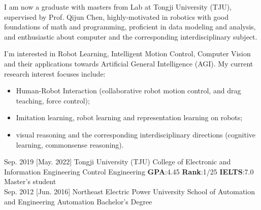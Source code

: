 \documentclass{resume}
\begin{document}
\makeheader

I am now a graduate with masters from  Lab at Tongji University (TJU), supervised by Prof.  {Qijun Chen}, highly-motivated in robotics with good foundations of math and programming, proficient in data modeling and analysis, and enthusiastic about computer and the corresponding interdisciplinary subject.

I'm interested in Robot Learning, Intelligent Motion Control, Computer Vision and their applications towards Artificial General Intelligence (AGI). My current research interest focuses include:
\begin{itemize}
  \item Human-Robot Interaction (collaborative robot motion control, and drag teaching, force control);
  \item Imitation learning, robot learning and representation learning on robots;
  \item visual reasoning and the corresponding interdisciplinary directions (cognitive learning, commonsense reasoning).\\
\end{itemize}

\begin{educations}
  \education%
    {Sep. 2019}%
    [May. 2022]%
    {Tongji University (TJU)}%
    {College of Electronic and Information Engineering}%
    {Control Engineering \quad \textbf{GPA}:4.45 \quad \textbf{Rank}:1/25 \quad \textbf{IELTS}:7.0}%
    {Master's student}\\

  \separator{0.5ex}
  \education%
    {Sep. 2012}%
    [Jun. 2016]%
    {Northeast Electric Power University}%
    {School of Automation and Engineering}%
    {Automation}%
    {Bachelor's Degree}
    
\end{educations}
\end{document}
